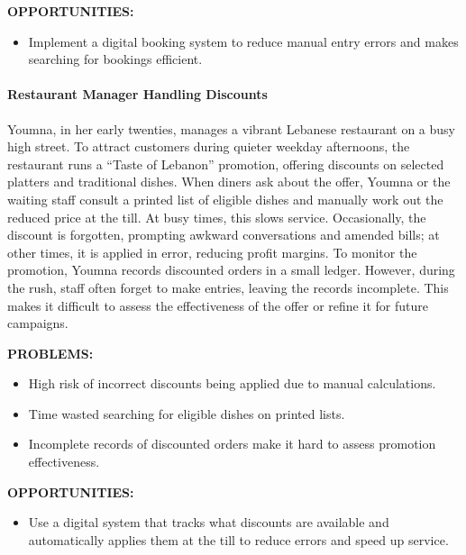 \documentclass[]{VUMIFTemplateClass}
\newcommand{\todocomment}[1]{%
    \begin{tcolorbox}[colback=red!20, colframe=red!60, arc=0pt, outer arc=0pt, boxrule=1pt, left=3pt, right=3pt, top=3pt, bottom=3pt]
        \textbf{\textcolor{orange!70!black}{TODO:}} #1
    \end{tcolorbox}
}
\newcommand{\subsubsubsection}[1]{\paragraph{#1}}
\begin{document}
\textbf{OPPORTUNITIES:}
\begin{itemize}
    \item Implement a digital booking system to reduce manual entry errors and
    makes searching for bookings efficient.
\end{itemize}


\subsubsubsection{Restaurant Manager Handling Discounts}


Youmna, in her early twenties, manages a vibrant Lebanese restaurant on a busy
high street. To attract customers during quieter weekday afternoons, the
restaurant runs a “Taste of Lebanon” promotion, offering discounts on selected
platters and traditional dishes. When diners ask about the offer, Youmna or the
waiting staff consult a printed list of eligible dishes and manually work out
the reduced price at the till. At busy times, this slows service. Occasionally,
the discount is forgotten, prompting awkward conversations and amended bills; at
other times, it is applied in error, reducing profit margins. To monitor the
promotion, Youmna records discounted orders in a small ledger. However, during
the rush, staff often forget to make entries, leaving the records incomplete.
This makes it difficult to assess the effectiveness of the offer or refine it
for future campaigns.

\textbf{PROBLEMS:}

\begin{itemize}
    \item High risk of incorrect discounts being applied due to manual calculations.
    \item Time wasted searching for eligible dishes on printed lists.
    \item Incomplete records of discounted orders make it hard to assess promotion effectiveness.
\end{itemize}
\textbf{OPPORTUNITIES:}
\begin{itemize}
    \item Use a digital system that tracks what discounts are available and
    automatically applies them at the till to reduce errors and speed up service.
\end{itemize}
\end{document}
